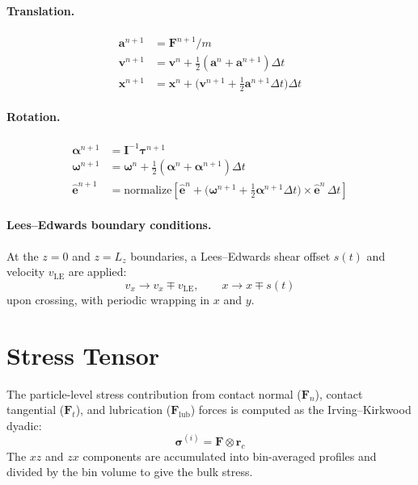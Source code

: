 \documentclass[12pt]{article}
\newcommand{\bs}[1]{\boldsymbol{#1}}
\begin{document}
\paragraph{Translation.}
\begin{align}
  \bs{a}^{n+1} &= \bs{F}^{n+1}/m \\
  \bs{v}^{n+1} &= \bs{v}^n + \tfrac{1}{2}(\bs{a}^n + \bs{a}^{n+1})\Delta t \\
  \bs{x}^{n+1} &= \bs{x}^n + \bigl(\bs{v}^{n+1} + \tfrac{1}{2}\bs{a}^{n+1}\Delta t\bigr)\Delta t
\end{align}

\paragraph{Rotation.}
\begin{align}
  \bs{\alpha}^{n+1} &= \bs{I}^{-1}\bs{\tau}^{n+1} \\
  \bs{\omega}^{n+1} &= \bs{\omega}^n + \tfrac{1}{2}(\bs{\alpha}^n + \bs{\alpha}^{n+1})\Delta t \\
  \hat{\bs{e}}^{n+1} &= \mathrm{normalize}\!\left[
    \hat{\bs{e}}^n + \bigl(\bs{\omega}^{n+1} + \tfrac{1}{2}\bs{\alpha}^{n+1}\Delta t\bigr)
    \times \hat{\bs{e}}^n\,\Delta t\right]
\end{align}

\paragraph{Lees--Edwards boundary conditions.}
At the $z=0$ and $z=L_z$ boundaries, a Lees--Edwards shear offset $s(t)$ and
velocity $v_\text{LE}$ are applied:
\begin{equation}
  v_x \to v_x \mp v_\text{LE}, \qquad
  x   \to x \mp s(t)
\end{equation}
upon crossing, with periodic wrapping in $x$ and $y$.

\section{Stress Tensor}

The particle-level stress contribution from contact normal ($\bs{F}_n$),
contact tangential ($\bs{F}_t$), and lubrication ($\bs{F}_\text{lub}$) forces
is computed as the Irving--Kirkwood dyadic:
\begin{equation}
  \bs{\sigma}^{(i)} = \bs{F} \otimes \bs{r}_c
\end{equation}
The $xz$ and $zx$ components are accumulated into bin-averaged profiles and
divided by the bin volume to give the bulk stress.
\end{document}
